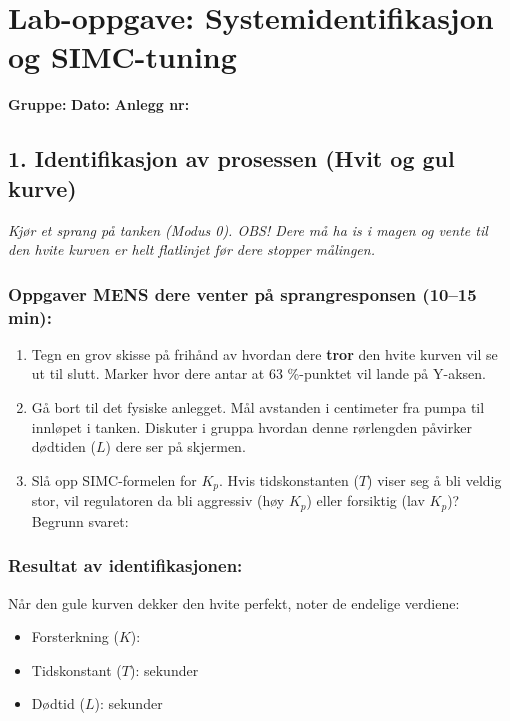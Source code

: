 \documentclass[a4paper,11pt]{article}
\begin{document}
\section*{Lab-oppgave: Systemidentifikasjon og SIMC-tuning}

\textbf{Gruppe:} \underline{\hspace{5cm}} \textbf{Dato:} \underline{\hspace{3cm}} \textbf{Anlegg nr:} \underline{\hspace{1cm}}

\subsection*{1. Identifikasjon av prosessen (Hvit og gul kurve)}
\textit{Kjør et sprang på tanken (Modus 0). OBS! Dere må ha is i magen og vente til den hvite kurven er helt flatlinjet før dere stopper målingen.}

\subsubsection*{Oppgaver MENS dere venter på sprangresponsen (10--15 min):}
\begin{enumerate}
    \item Tegn en grov skisse på frihånd av hvordan dere \textbf{tror} den hvite kurven vil se ut til slutt. Marker hvor dere antar at 63 \%-punktet vil lande på Y-aksen.
    \item Gå bort til det fysiske anlegget. Mål avstanden i centimeter fra pumpa til innløpet i tanken. Diskuter i gruppa hvordan denne rørlengden påvirker dødtiden ($L$) dere ser på skjermen.
    \item Slå opp SIMC-formelen for $K_p$. Hvis tidskonstanten ($T$) viser seg å bli veldig stor, vil regulatoren da bli aggressiv (høy $K_p$) eller forsiktig (lav $K_p$)? Begrunn svaret: \\
    \hrulefill
\end{enumerate}

\subsubsection*{Resultat av identifikasjonen:}
Når den gule kurven dekker den hvite perfekt, noter de endelige verdiene:
\begin{itemize}
    \item Forsterkning ($K$): \underline{\hspace{2cm}} 
    \item Tidskonstant ($T$): \underline{\hspace{2cm}} sekunder
    \item Dødtid ($L$): \underline{\hspace{2cm}} sekunder
\end{itemize}
\end{document}
